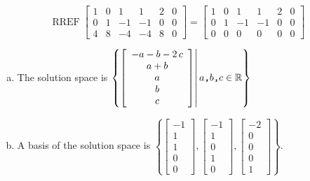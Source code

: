 \begin{exerciseAnswer} 


\[\operatorname{RREF} \left[\begin{array}{ccccc|c}
1 & 0 & 1 & 1 & 2 & 0 \\
0 & 1 & -1 & -1 & 0 & 0 \\
4 & 8 & -4 & -4 & 8 & 0
\end{array}\right] = \left[\begin{array}{ccccc|c}
1 & 0 & 1 & 1 & 2 & 0 \\
0 & 1 & -1 & -1 & 0 & 0 \\
0 & 0 & 0 & 0 & 0 & 0
\end{array}\right] \]


\begin{enumerate}[(a)]
\item The solution space is \( \left\{ \left[\begin{array}{c}
-a - b - 2 \, c \\
a + b \\
a \\
b \\
c
\end{array}\right] \middle|\,a\text{\texttt{,}}b\text{\texttt{,}}c\in\mathbb{R}\right\} \)
\item A basis of the solution space is \( \left\{ \left[\begin{array}{c}
-1 \\
1 \\
1 \\
0 \\
0
\end{array}\right] , \left[\begin{array}{c}
-1 \\
1 \\
0 \\
1 \\
0
\end{array}\right] , \left[\begin{array}{c}
-2 \\
0 \\
0 \\
0 \\
1
\end{array}\right] \right\} \).
\end{enumerate}
    
\end{exerciseAnswer}
    
